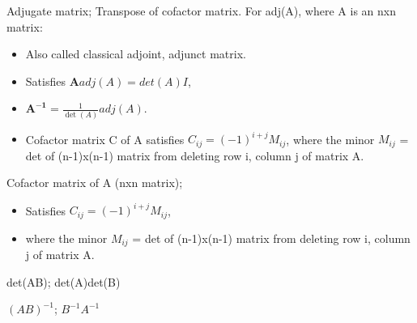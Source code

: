 


Adjugate matrix; Transpose of cofactor matrix. For adj(A), where A is an nxn matrix: \begin{itemize} \item Also called classical adjoint, adjunct matrix.  \item Satisfies $\mathbf{A}adj(A)=det(A)I$, \item $\mathbf{A^{-1}}=\frac{1}{\det(A)}adj(A)$.  \item Cofactor matrix C of A satisfies $C_{ij}=(-1)^{i+j}M_{ij}$, where the minor $M_{ij}$ = det of (n-1)x(n-1) matrix from deleting row i, column j of matrix A.  \end{itemize}

Cofactor matrix of A (nxn matrix); \begin{itemize} \item Satisfies $C_{ij}=(-1)^{i+j}M_{ij}$, \item where the minor $M_{ij}$ = det of (n-1)x(n-1) matrix from deleting row i, column j of matrix A.  \end{itemize}

det(AB); det(A)det(B)

$(AB)^{-1}$; $B^{-1}A^{-1}$


